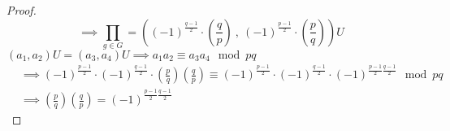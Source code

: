 \documentclass{article}
\begin{document}
\begin{proof}
		$$
		\implies \prod_{g\in G}=((-1)^{\frac{q-1}{2}} \cdot (\frac{q}{p})\ ,\ (-1)^{\frac{p-1}{2}} \cdot (\frac{p}{q}))U
		$$
		$(a_1,a_2)U=(a_3,a_4)U \implies a_1a_2 \equiv a_3a_4 \mod pq$
		\begin{align*}
		&\implies (-1)^{\frac{p-1}{2}} \cdot(-1)^{\frac{q-1}{2}} \cdot \left( \frac { p } { q } \right) \left( \frac { q } { p } \right) \equiv (-1)^{\frac{p-1}{2}} \cdot(-1)^{\frac{q-1}{2}} \cdot ( - 1 ) ^ { \frac { p - 1 } { 2 } \frac { q - 1 } { 2 } } \mod pq\\
		&\implies \left( \frac { p } { q } \right) \left( \frac { q } { p } \right) = ( - 1 ) ^ { \frac { p - 1 } { 2 } \frac { q - 1 } { 2 } }
		\end{align*}		
	\end{proof}	
\end{document}
